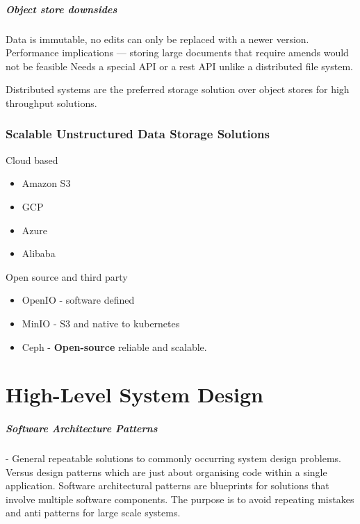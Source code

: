 \documentclass[a4paper, 11pt]{book}
\begin{document}
    \paragraph{Object store downsides}
    Data is immutable, no edits can only be replaced with a newer version.
    Performance implications --- storing large documents that require amends would not be feasible
    Needs a special API or a rest API unlike a distributed file system.

    Distributed systems are the preferred storage solution over object stores for high throughput solutions.

    \subsection{Scalable Unstructured Data Storage Solutions}
    Cloud based
    \begin{itemize}%
        \item Amazon S3
        \item GCP
        \item Azure
        \item Alibaba
    \end{itemize}

    Open source and third party
    \begin{itemize}
        \item OpenIO - software defined
        \item MinIO - S3 and native to kubernetes
        \item Ceph - \textbf{Open-source} reliable and scalable.
    \end{itemize}


    \chapter{High-Level System Design}

    \paragraph{Software Architecture Patterns} - General repeatable solutions to commonly occurring system design problems.
    Versus design patterns which are just about organising code within a single application.
    Software architectural patterns are blueprints for solutions that involve multiple software components.
    The purpose is to avoid repeating mistakes and anti patterns for large scale systems.
\end{document}
